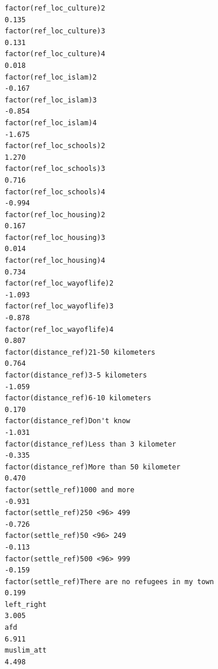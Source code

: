 \documentclass[
]{article}
\begin{document}
\begin{table}
\begin{minipage}[t]{\linewidth}
{\begin{verbatim}
factor(ref_loc_culture)2                                                            0.135
factor(ref_loc_culture)3                                                            0.131
factor(ref_loc_culture)4                                                            0.018
factor(ref_loc_islam)2                                                             -0.167
factor(ref_loc_islam)3                                                             -0.854
factor(ref_loc_islam)4                                                             -1.675
factor(ref_loc_schools)2                                                            1.270
factor(ref_loc_schools)3                                                            0.716
factor(ref_loc_schools)4                                                           -0.994
factor(ref_loc_housing)2                                                            0.167
factor(ref_loc_housing)3                                                            0.014
factor(ref_loc_housing)4                                                            0.734
factor(ref_loc_wayoflife)2                                                         -1.093
factor(ref_loc_wayoflife)3                                                         -0.878
factor(ref_loc_wayoflife)4                                                          0.807
factor(distance_ref)21-50 kilometers                                                0.764
factor(distance_ref)3-5 kilometers                                                 -1.059
factor(distance_ref)6-10 kilometers                                                 0.170
factor(distance_ref)Don't know                                                     -1.031
factor(distance_ref)Less than 3 kilometer                                          -0.335
factor(distance_ref)More than 50 kilometer                                          0.470
factor(settle_ref)1000 and more                                                    -0.931
factor(settle_ref)250 <96> 499                                                     -0.726
factor(settle_ref)50 <96> 249                                                      -0.113
factor(settle_ref)500 <96> 999                                                     -0.159
factor(settle_ref)There are no refugees in my town                                  0.199
left_right                                                                          3.005
afd                                                                                 6.911
muslim_att                                                                          4.498

\end{verbatim}}
\end{minipage}
\end{table}
\end{document}
